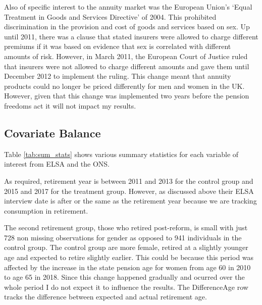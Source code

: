 \documentclass[12pt]{article}
\begin{document}
Also of specific interest to the annuity market was the European Union's `Equal
Treatment in Goods and Services Directive' of 2004. This prohibited
discrimination in the provision and cost of goods and services based on sex. Up
until 2011, there was a clause that stated insurers were allowed to charge
different premiums if it was based on evidence that sex is correlated with
different amounts of risk. However, in March 2011, the European Court of Justice
ruled that insurers were not allowed to charge different amounts and gave them
until December 2012 to implement the ruling. This change meant that annuity
products could no longer be priced differently for men and women in the UK.
However, given that this change was implemented two years before the pension
freedoms act it will not impact my results.



\subsection{Covariate Balance}

Table \ref{tab:sum_stats} shows various summary statistics for each variable of
interest from ELSA and the ONS.

As required, retirement year is between 2011 and 2013 for the control group and
2015 and 2017 for the treatment group. However, as discussed above their ELSA
interview date is after or the same as the retirement year because we are
tracking consumption in retirement.

The second retirement group, those who retired post-reform, is small with just
728 non missing observations for gender as opposed to 941 individuals in the
control group. The control group are more female, retired at a slightly younger
age and expected to retire slightly earlier. This could be because this period
was affected by the increase in the state pension age for women from age 60 in
2010 to age 65 in 2018. Since this change happened gradually and ocurred over
the whole period I do not expect it to influence the results. The DifferenceAge
row tracks the difference between expected and actual retirement age.
\end{document}

